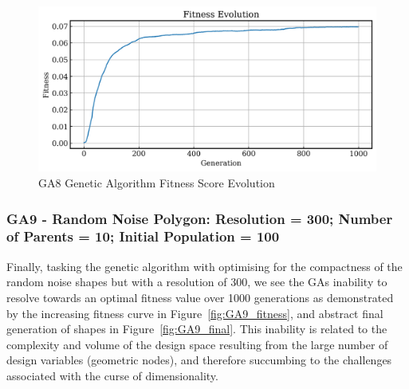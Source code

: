 \documentclass{article}
\begin{document}
\begin{figure}[H]
    \centering
    \includegraphics[width=0.75\linewidth]{figures/GAResults/GA8/fitness_curve.png}
    \caption{GA8 Genetic Algorithm Fitness Score Evolution}
    \label{fig:GA8_fitness}
\end{figure}

\subsubsection*{GA9 - Random Noise Polygon: Resolution = 300; Number of Parents = 10; Initial Population = 100}
Finally, tasking the genetic algorithm with optimising for the compactness of the random noise shapes but with a resolution of 300, we see the GAs inability to resolve towards an optimal fitness value over 1000 generations as demonstrated by the increasing fitness curve in Figure~\ref{fig:GA9_fitness}, and abstract final generation of shapes in Figure~\ref{fig:GA9_final}. This inability is related to the complexity and volume of the design space resulting from the large number of design variables (geometric nodes), and therefore succumbing to the challenges associated with the curse of dimensionality. 
\end{document}
